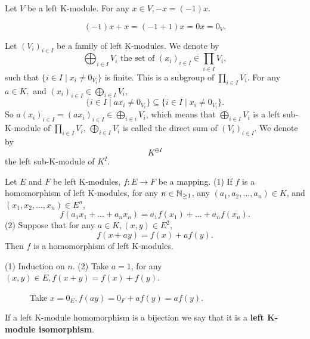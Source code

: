 \begin{propositionenv}
    Let $V$ be a left K-module. For any $x\in V,  -x=(-1)x$.
\end{propositionenv}
\begin{proofenv}
    $$(-1)x+x=(-1+1)x=0x=0_V.$$
\end{proofenv}
\begin{exampleenv}
    Let $(V_i)_{i\in I}$ be a family of left K-modules. We denote by 
    $$\bigoplus_{i\in I}V_i\text{ the set of }(x_i)_{i\in I}\in \prod_{i\in I}V_i, $$
    such that $\{i\in I\mid x_i\not=0_{V_i}\}$ is finite. This is a subgroup of $\prod_{i\in I}V_i$. For any $a\in K, $ and $(x_i)_{i\in I}\in \bigoplus_{i\in I}V_i$, 
    $$\{i\in I\mid ax_i\not=0_{V_i}\}\subseteq\{i\in I\mid x_i\not=0_{V_i}\}.$$
    So $\displaystyle a(x_i)_{i\in I}=(ax_i)_{i\in I}\in \bigoplus_{i\in i}V_i$,  which means that $\displaystyle\bigoplus_{i\in I}V_i$ is a left sub-K-module of $\displaystyle\prod_{i\in I}V_i$. $\displaystyle\bigoplus_{i\in I}V_i$ is called the direct sum of $(V_i)_{i\in I}$. We denote by 
    $$K^{\oplus I}$$
    the left sub-K-module of $K^I$.
\end{exampleenv}
\begin{propositionenv}
    Let $E$ and $F$ be left K-modules, $f:E\rightarrow F$ be a mapping.
    \newline
    (1) If $f$ is a homomorphism of left K-modules,  for any $n\in \mathbb{N}_{\ge1}$,  any $(a_1, a_2, \dots, a_n)\in K$,  and $(x_1, x_2, \dots, x_n)\in E^n$, 
    $$f(a_1x_1+\dots+a_nx_n)=a_1f(x_1)+\dots+a_nf(x_n).$$
    (2) Suppose that for any $a\in K, (x, y)\in E^2$, 
    $$f(x+ay)=f(x)+af(y).$$
    Then $f$ is a homomorphism of left K-modules.
\end{propositionenv}
\begin{proofenv}
    (1) Induction on $n$.
    \newline
    (2) Take $a=1$,  for any $(x, y)\in E, f(x+y)=f(x)+f(y)$. 
    
    \ \ \ \ \ \ Take $x=0_E, f(ay)=0_F+af(y)=af(y)$.
\end{proofenv}
\begin{definitionenv}
    If a left K-module homomorphism is a bijection we say that it is a \textbf{left K-module isomorphism}.
\end{definitionenv}
